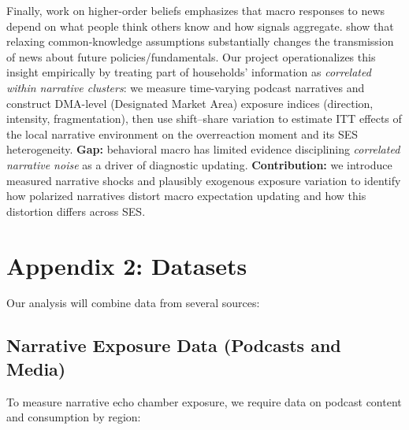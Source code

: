 \documentclass[12pt]{article}
\begin{document}
Finally, work on higher-order beliefs emphasizes that macro responses to news depend on what people think others know and how signals aggregate. \citet{AngeletosLian2018} show that relaxing common-knowledge assumptions substantially changes the transmission of news about future policies/fundamentals. Our project operationalizes this insight empirically by treating part of households' information as \emph{correlated within narrative clusters}: we measure time-varying podcast narratives and construct DMA-level (Designated Market Area) exposure indices (direction, intensity, fragmentation), then use shift--share variation to estimate ITT effects of the local narrative environment on the overreaction moment and its SES heterogeneity. \textbf{Gap:} behavioral macro has limited evidence disciplining \emph{correlated narrative noise} as a driver of diagnostic updating. \textbf{Contribution:} we introduce measured narrative shocks and plausibly exogenous exposure variation to identify how polarized narratives distort macro expectation updating and how this distortion differs across SES.

\section*{Appendix 2: Datasets} \label{appendix_datasets}
Our analysis will combine data from several sources:

\subsection*{Narrative Exposure Data (Podcasts and Media)}
To measure narrative echo chamber exposure, we require data on podcast content and consumption by region:
\end{document}
